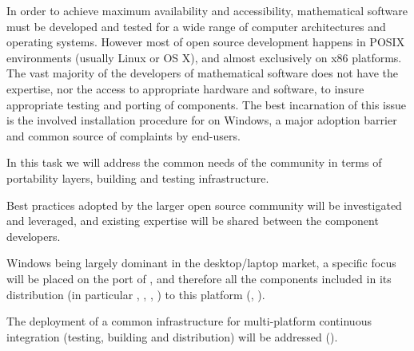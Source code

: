 \begin{workpackage}[id=component-architecture,wphases=0-48!.5,
  title=Component Architecture,lead=UV,
  PSRM=64,UVRM=8,SARM=16, USHRM=4, USORM=6, UORM=4, LLRM=22]
  \begin{tasklist}
  \begin{task}[id=portability,title=Portability,lead=UV,PM=28,partners={PS},wphases=0-36]
    In order to achieve maximum availability and accessibility,
    mathematical software must be developed and tested for a wide range
    of computer architectures and operating systems.  However most of
    open source development happens in POSIX environments (usually
    Linux or OS X), and almost exclusively on x86 platforms.  The vast
    majority of the developers of mathematical software does not have
    the expertise, nor the access to appropriate hardware and software, to insure
    appropriate testing and porting of components.  The best
    incarnation of this issue is the involved installation procedure
    for \Sage on Windows, a major adoption barrier and common source of
    complaints by end-users.

    In this task we will address the common needs of the community in
    terms of portability layers, building and testing infrastructure.

    \begin{compactitem}
    \item Best practices adopted by the larger open source community
      will be investigated and leveraged, and existing expertise will
      be shared between the component developers.
    \item Windows being largely dominant in the desktop/laptop market,
      a specific focus will be placed on the port of \Sage, and
      therefore all the components included in its distribution (in
      particular \PariGP, \GAP, \Singular, \Linbox) to this platform
      (,
      ).
    \item The deployment of a common infrastructure for multi-platform
      continuous integration (testing, building and distribution) will
      be addressed
      ().
    \end{compactitem}


\end{task}
\end{tasklist}
\end{workpackage}
